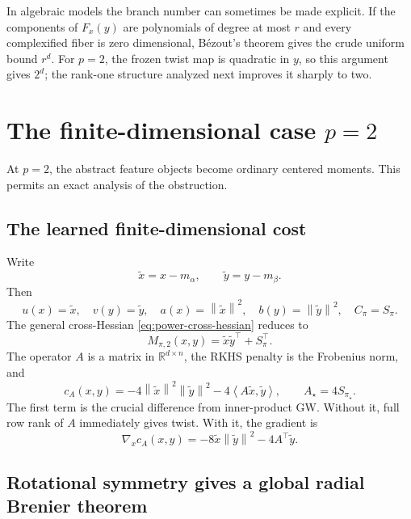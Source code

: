 \documentclass[11pt,a4paper]{article}
\theoremstyle{definition}
\theoremstyle{remark}
\newcommand{\R}{\mathbb R}
\newcommand{\norm}[1]{\left\lVert #1\right\rVert}
\newcommand{\ip}[2]{\left\langle #1,#2\right\rangle}
\begin{document}
In algebraic models the branch number can sometimes be made explicit.  If
the components of \(F_x(y)\) are polynomials of degree at most \(r\) and every
complexified fiber is zero dimensional, B\'ezout's theorem gives the crude
uniform bound \(r^d\).  For \(p=2\), the frozen twist map is quadratic in
\(y\), so this argument gives \(2^d\); the rank-one structure analyzed next
improves it sharply to two.

\section{The finite-dimensional case \texorpdfstring{\(p=2\)}{p=2}}
\label{sec:p2}

At \(p=2\), the abstract feature objects become ordinary centered moments.
This permits an exact analysis of the obstruction.

\subsection{The learned finite-dimensional cost}

Write
\begin{equation}
  \widetilde x=x-m_\alpha,
  \qquad
  \widetilde y=y-m_\beta.
  \label{eq:centered-euclidean-variables}
\end{equation}
Then
\[
  u(x)=\widetilde x,
  \quad v(y)=\widetilde y,
  \quad a(x)=\norm{\widetilde x}^2,
  \quad b(y)=\norm{\widetilde y}^2,
  \quad C_\pi=S_\pi.
\]
The general cross-Hessian \eqref{eq:power-cross-hessian} reduces to
\begin{equation}
  M_{\pi,2}(x,y)
  =\widetilde x\widetilde y^\top+S_\pi^\top.
  \label{eq:p2-cross-hessian}
\end{equation}
The operator \(A\) is a matrix in \(\R^{d\times n}\), the RKHS penalty is
the Frobenius norm, and
\begin{equation}
  c_A(x,y)
  =-4\norm{\widetilde x}^2\norm{\widetilde y}^2
   -4\ip{A\widetilde x}{\widetilde y},
  \qquad
  A_\star=4S_{\pi_\star}.
  \label{eq:p2-learned-cost}
\end{equation}
The first term is the crucial difference from inner-product GW.  Without it,
full row rank of \(A\) immediately gives twist.  With it, the gradient is
\begin{equation}
  \nabla_xc_A(x,y)
  =-8\widetilde x\norm{\widetilde y}^2
   -4A^\top\widetilde y.
  \label{eq:p2-cost-gradient}
\end{equation}

\subsection{Rotational symmetry gives a global radial Brenier theorem}
\end{document}
